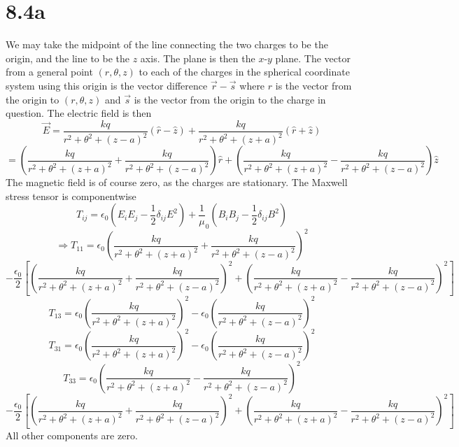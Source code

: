 \documentclass{article}
\begin{document}
\section*{8.4a}
We may take the midpoint of the line connecting the two charges to be the origin, and the line to be the $z$ axis. The plane is then the $x$-$y$ plane. The vector from a general point $(r,\theta, z)$ to each of the charges in the spherical coordinate system using this origin is the vector difference $\vec{r}-\vec{s}$ where $r$ is the vector from the origin to $(r,\theta,z)$ and $\vec{s}$ is the vector from the origin to the charge in question. The electric field is then
\[\vec{E}=\frac{kq}{r^2+\theta^2+(z-a)^2}(\hat{r}-\hat{z})+\frac{kq}{r^2+\theta^2+(z+a)^2}(\hat{r}+\hat{z})\]
\[=\left( \frac{kq}{r^2+\theta^2+(z+a)^2}+\frac{kq}{r^2+\theta^2+(z-a)^2}\right)\hat{r}+\left( \frac{kq}{r^2+\theta^2+(z+a)^2}-\frac{kq}{r^2+\theta^2+(z-a)^2}\right)\hat{z}\]
The magnetic field is of course zero, as the charges are stationary. The Maxwell stress tensor is componentwise
\[T_{ij}=\epsilon_0\left( E_iE_j-\frac{1}{2}\delta_{ij}E^2\right)+\frac{1}\mu_0\left( B_iB_j-\frac{1}{2}\delta_{ij}B^2 \right)\]
\[\Rightarrow T_{11}=   \epsilon_{0} \left( \frac{kq}{r^2+\theta^2+(z+a)^2}+\frac{kq}{r^2+\theta^2+(z-a)^2}\right)^2\]\[-\frac{  \epsilon_{0}}{2}\left[ \left(  \frac{kq}{r^{2}+\theta^{2}+(z+a)^{2}}+ \frac{kq}{r^2+\theta^2+(z-a)^2}\right)^{2}+\left( \frac{kq}{r^2+\theta^2+(z+a)^2}- \frac{kq}{r^2+\theta^2+(z-a)^2} \right)^{2}\right]\]
\[T_{13}=  \epsilon_{0}\left( \frac{kq}{r^2+\theta^2+(z+a)^2}\right)^2-  \epsilon_{0}\left( \frac{kq}{r^2+\theta^2+(z-a)^2}\right)^2\]
\[T_{31}=  \epsilon_{0}\left( \frac{kq}{r^2+\theta^2+(z+a)^2}\right)^2-  \epsilon_{0}\left( \frac{kq}{r^2+\theta^2+(z-a)^2}\right)^2\]
\[T_{33}=
  \epsilon_{0}\left( \frac{kq}{r^2+\theta^2+(z+a)^2}-\frac{kq}{r^2+\theta^2+(z-a)^2}\right)^2\]\[-\frac{  \epsilon_{0}}{2}\left[ \left(  \frac{kq}{r^{2}+\theta^{2}+(z+a)^{2}}+ \frac{kq}{r^2+\theta^2+(z-a)^2}\right)^{2}+\left( \frac{kq}{r^2+\theta^2+(z+a)^2}- \frac{kq}{r^2+\theta^2+(z-a)^2} \right)^{2}\right]\]
All other components are zero.
\end{document}
